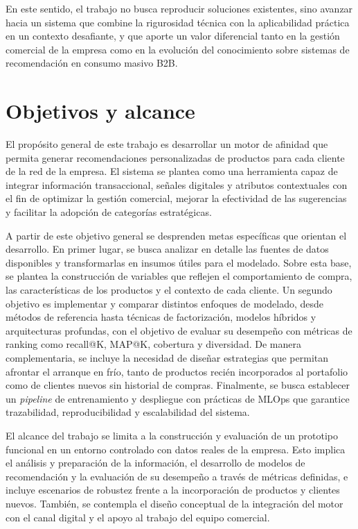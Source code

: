 En este sentido, el trabajo no busca reproducir soluciones existentes, sino avanzar hacia un sistema que combine la rigurosidad técnica con la aplicabilidad práctica en un contexto desafiante, y que aporte un valor diferencial tanto en la gestión comercial de la empresa como en la evolución del conocimiento sobre sistemas de recomendación en consumo masivo B2B.



\section{Objetivos y alcance}

El propósito general de este trabajo es desarrollar un motor de afinidad que permita generar recomendaciones personalizadas de productos para cada cliente de la red de la empresa. El sistema se plantea como una herramienta capaz de integrar información transaccional, señales digitales y atributos contextuales con el fin de optimizar la gestión comercial, mejorar la efectividad de las sugerencias y facilitar la adopción de categorías estratégicas. 

A partir de este objetivo general se desprenden metas específicas que orientan el desarrollo. En primer lugar, se busca analizar en detalle las fuentes de datos disponibles y transformarlas en insumos útiles para el modelado. Sobre esta base, se plantea la construcción de variables que reflejen el comportamiento de compra, las características de los productos y el contexto de cada cliente. Un segundo objetivo es implementar y comparar distintos enfoques de modelado, desde métodos de referencia hasta técnicas de factorización, modelos híbridos y arquitecturas profundas, con el objetivo de evaluar su desempeño con métricas de ranking como recall@K, MAP@K, cobertura y diversidad. De manera complementaria, se incluye la necesidad de diseñar estrategias que permitan afrontar el arranque en frío, tanto de productos recién incorporados al portafolio como de clientes nuevos sin historial de compras. Finalmente, se busca establecer un \textit{pipeline} de entrenamiento y despliegue con prácticas de MLOps que garantice trazabilidad, reproducibilidad y escalabilidad del sistema. 

El alcance del trabajo se limita a la construcción y evaluación de un prototipo funcional en un entorno controlado con datos reales de la empresa. Esto implica el análisis y preparación de la información, el desarrollo de modelos de recomendación y la evaluación de su desempeño a través de métricas definidas, e incluye escenarios de robustez frente a la incorporación de productos y clientes nuevos. También, se contempla el diseño conceptual de la integración del motor con el canal digital y el apoyo al trabajo del equipo comercial.
